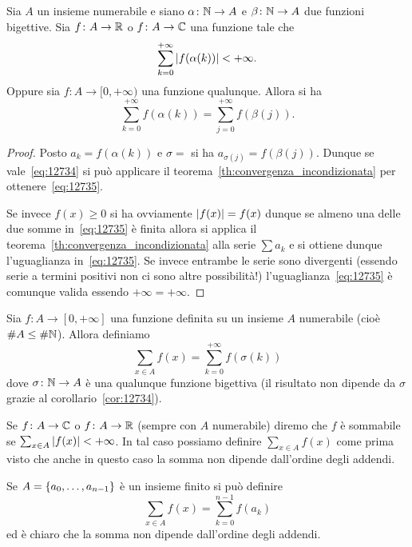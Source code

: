 \begin{corollary}\label{cor:12734}
  Sia $A$ un insieme numerabile e siano 
  $\alpha\colon {\mathbb N}\to A$ e $\beta\colon {\mathbb N}\to A$ 
  due funzioni bigettive.
  Sia $f\colon A\to {\mathbb R}$ o 
  $f\colon A \to {\mathbb C}$ una funzione tale che 
  \begin{equation}\label{eq:12734}
    \sum_{k=0}^{+\infty} {\left|f(\alpha(k))\right|} < +\infty.  
  \end{equation}
  Oppure sia $f\colon A\to [0,+\infty)$ una funzione 
  qualunque. 
  Allora si ha
  \begin{equation}\label{eq:12735}
    \sum_{k=0}^{+\infty} f(\alpha(k)) =
    \sum_{j=0}^{+\infty} f(\beta(j)). 
  \end{equation}
\end{corollary}
%
\begin{proof}
Posto $a_k=f(\alpha (k))$ e $\sigma = $ si ha 
$a_{\sigma(j)} = f(\beta (j))$.
Dunque se vale~\eqref{eq:12734} si può 
applicare il teorema~\ref{th:convergenza_incondizionata}
per ottenere~\eqref{eq:12735}.

Se invece $f(x)\ge 0$ si ha ovviamente ${\left|f(x)\right|}=f(x)$
dunque se almeno una delle due somme in~\eqref{eq:12735}
è finita allora si applica il teorema~\ref{th:convergenza_incondizionata}
alla serie $\sum a_k$ e si ottiene dunque l'uguaglianza 
in~\eqref{eq:12735}.
Se invece entrambe le serie sono divergenti
(essendo serie a termini positivi non ci sono altre possibilità!)
l'uguaglianza~\eqref{eq:12735} è comunque valida
essendo $+\infty = +\infty$.
\end{proof}

\begin{definition}
Sia $f\colon A\to [0,+\infty]$ una funzione definita su un insieme 
$A$ numerabile (cioè $\#A \le \#{\mathbb N}$).
Allora definiamo
  \[
    \sum_{x\in A}f(x)
    = \sum_{k=0}^{+\infty} f(\sigma(k)) 
  \]
dove $\sigma\colon {\mathbb N}\to A$ è una qualunque funzione bigettiva
(il risultato non dipende da $\sigma$ grazie al corollario~\ref{cor:12734}).

Se $f\colon A\to {\mathbb C}$ o $f\colon A\to {\mathbb R}$ (sempre con $A$ numerabile)
diremo che $f$ è sommabile se $\sum_{x\in A}{\left|f(x)\right|}<+\infty$. 
In tal caso possiamo definire $\sum_{x\in A} f(x)$ come prima
visto che anche in questo caso la somma non dipende
dall'ordine degli addendi.

Se $A={\left\{ a_0, \dots, a_{n-1} \right\}}$ è un insieme finito si può definire 
\[
  \sum_{x\in A} f(x) = \sum_{k=0}^{n-1} f(a_k)
\]
ed è chiaro che la somma non dipende dall'ordine degli addendi.
\end{definition}

